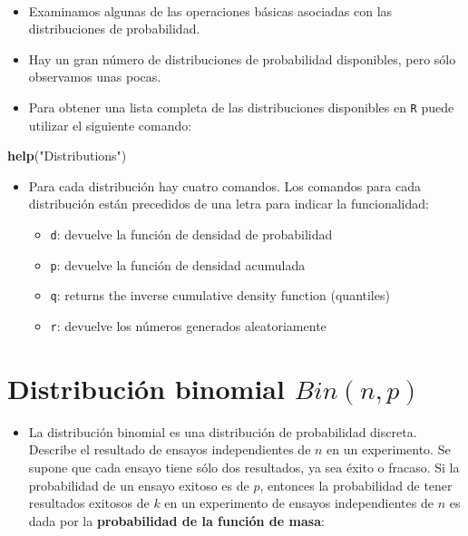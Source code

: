 \documentclass[]{book}
\newenvironment{Shaded}{\begin{snugshade}}{\end{snugshade}}
\newcommand{\KeywordTok}[1]{\textcolor[rgb]{0.13,0.29,0.53}{\textbf{#1}}}
\newcommand{\StringTok}[1]{\textcolor[rgb]{0.31,0.60,0.02}{#1}}
\newcommand{\NormalTok}[1]{#1}
\providecommand{\tightlist}{%
  \setlength{\itemsep}{0pt}\setlength{\parskip}{0pt}}
\begin{document}
~

\begin{itemize}
\item
  Examinamos algunas de las operaciones básicas asociadas con las
  distribuciones de probabilidad.
\item
  Hay un gran número de distribuciones de probabilidad disponibles, pero
  sólo observamos unas pocas.
\item
  Para obtener una lista completa de las distribuciones disponibles en
  \texttt{R} puede utilizar el siguiente comando:
\end{itemize}

\begin{Shaded}
\begin{Highlighting}[]
\KeywordTok{help}\NormalTok{(}\StringTok{"Distributions"}\NormalTok{)}
\end{Highlighting}
\end{Shaded}

\begin{itemize}
\item
  Para cada distribución hay cuatro comandos. Los comandos para cada
  distribución están precedidos de una letra para indicar la
  funcionalidad:

  \begin{itemize}
  \tightlist
  \item
    \texttt{d}: devuelve la función de densidad de probabilidad
  \item
    \texttt{p}: devuelve la función de densidad acumulada
  \item
    \texttt{q}: returns the inverse cumulative density function
    (quantiles)
  \item
    \texttt{r}: devuelve los números generados aleatoriamente
  \end{itemize}
\end{itemize}

\section{\texorpdfstring{Distribución binomial
\(Bin(n,p)\)}{Distribución binomial Bin(n,p)}}\label{distribuciuxf3n-binomial-binnp}

\begin{itemize}
\tightlist
\item
  La distribución binomial es una distribución de probabilidad discreta.
  Describe el resultado de ensayos independientes de \(n\) en un
  experimento. Se supone que cada ensayo tiene sólo dos resultados, ya
  sea éxito o fracaso. Si la probabilidad de un ensayo exitoso es de
  \(p\), entonces la probabilidad de tener resultados exitosos de \(k\)
  en un experimento de ensayos independientes de \(n\) es dada por la
  \textbf{probabilidad de la función de masa}:
\end{itemize}
\end{document}
